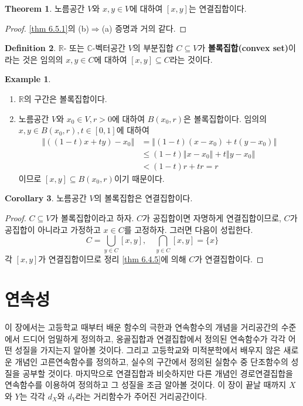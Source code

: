 \documentclass[11pt]{book}
\numberwithin{equation}{chapter}
\def\RR{\mathbb{R}}
\def\CC{\mathbb{C}}
\newcommand{\norm}[1]{\left\Vert#1\right\Vert}
\theoremstyle{definition}
\newtheorem{thm}{Theorem}[section]
\newtheorem{cor}[thm]{Corollary}
\newtheorem{defn}[thm]{Definition}
\newtheorem*{ex}{Example}
\newenvironment{enum}
	{\begin{enumerate}[label=(\alph*), leftmargin=2\parindent]}
	{\end{enumerate}}
\begin{document}
\begin{thm}
     노름공간 \(V\)와 \(x, y \in V\)에 대하여 \([x, y]\)는 연결집합이다.
\end{thm}
\begin{proof}
    \ref{thm 6.5.1}의 (b)\(\Rightarrow\)(a) 증명과 거의 같다.
\end{proof}

\begin{defn}
    \(\RR\)- 또는 \(\CC\)-벡터공간 \(V\)의 부분집합 \(C \subseteq V\)가 \textbf{볼록집합(convex set)}이라는 것은 임의의 \(x, y \in C\)에 대하여 \([x, y] \subseteq C\)라는 것이다.
\end{defn}
\begin{ex}
    \quad

    \begin{enum}
        \item \(\RR\)의 구간은 볼록집합이다.
        \item 노름공간 \(V\)와 \(x_0 \in V, r > 0\)에 대하여 \(B(x_0, r)\)은 볼록집합이다. 임의의 \(x, y \in B(x_0, r), t \in [0, 1]\)에 대하여
        \begin{align*}
            \norm{((1-t)x + ty) - x_0} &= \norm{(1-t)(x - x_0) + t(y - x_0)}\\
            &\le (1-t)\norm{x-x_0} + t\norm{y - x_0}\\
            &< (1-t)r+tr  = r 
        \end{align*}
        이므로 \([x, y] \subseteq B(x_0, r)\)이기 때문이다.
    \end{enum}
\end{ex}

\begin{cor}
    노름공간 \(V\)의 볼록집합은 연결집합이다.
\end{cor}
\begin{proof}
    \(C \subseteq V\)가 볼록집합이라고 하자. \(C\)가 공집합이면 자명하게 연결집합이므로, \(C\)가 공집합이 아니라고 가정하고 \(x \in C\)를 고정하자. 그러면 다음이 성립한다.
    \[
        C = \bigcup_{y \in C} [x, y], \quad \bigcap_{y \in C} [x, y] = \{x\}
    \]
    각 \([x, y]\)가 연결집합이므로 정리 \ref{thm 6.4.5}에 의해 \(C\)가 연결집합이다.
\end{proof}



\chapter{연속성} \label{sec conti}

이 장에서는 고등학교 때부터 배운 함수의 극한과 연속함수의 개념을 거리공간의 수준에서 드디어 엄밀하게 정의하고, 옹골집합과 연결집합에서 정의된 연속함수가 각각 어떤 성질을 가지는지 알아볼 것이다. 그리고 고등학교와 미적분학에서 배우지 않은 새로운 개념인 고른연속함수를 정의하고, 실수의 구간에서 정의된 실함수 중 단조함수의 성질을 공부할 것이다. 마지막으로 연결집합과 비슷하지만 다른 개념인 경로연결집합을 연속함수를 이용하여 정의하고 그 성질을 조금 알아볼 것이다. 이 장이 끝날 때까지 \(X\)와 \(Y\)는 각각 \(d_X\)와 \(d_Y\)라는 거리함수가 주어진 거리공간이다.
\end{document}
